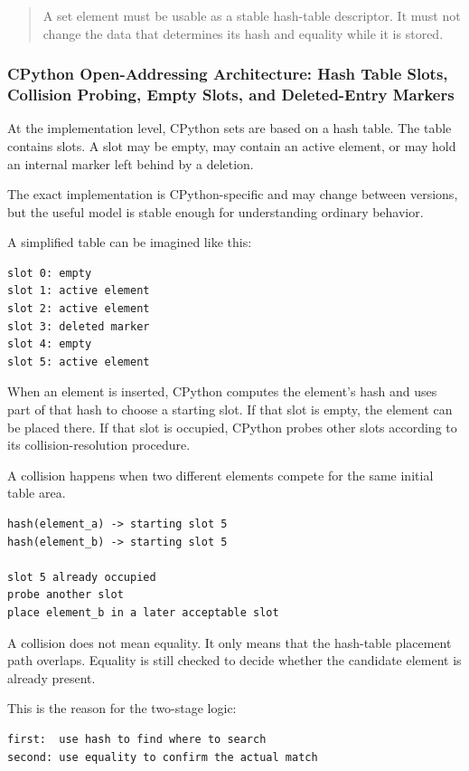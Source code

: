 \begin{quote}
A set element must be usable as a stable hash-table descriptor. It must not change the data that determines its hash and equality while it is stored.
\end{quote}

\subsubsection{CPython Open-Addressing Architecture: Hash Table Slots, Collision Probing, Empty Slots, and Deleted-Entry Markers}

At the implementation level, CPython sets are based on a hash table. The table contains slots. A slot may be empty, may contain an active element, or may hold an internal marker left behind by a deletion.

The exact implementation is CPython-specific and may change between versions, but the useful model is stable enough for understanding ordinary behavior.

A simplified table can be imagined like this:

\begin{verbatim}
slot 0: empty
slot 1: active element
slot 2: active element
slot 3: deleted marker
slot 4: empty
slot 5: active element
\end{verbatim}

When an element is inserted, CPython computes the element's hash and uses part of that hash to choose a starting slot. If that slot is empty, the element can be placed there. If that slot is occupied, CPython probes other slots according to its collision-resolution procedure.

A collision happens when two different elements compete for the same initial table area.

\begin{verbatim}
hash(element_a) -> starting slot 5
hash(element_b) -> starting slot 5

slot 5 already occupied
probe another slot
place element_b in a later acceptable slot
\end{verbatim}

A collision does not mean equality. It only means that the hash-table placement path overlaps. Equality is still checked to decide whether the candidate element is already present.

This is the reason for the two-stage logic:

\begin{verbatim}
first:  use hash to find where to search
second: use equality to confirm the actual match
\end{verbatim}

